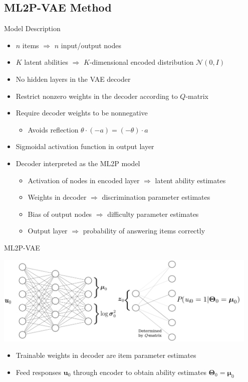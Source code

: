\documentclass{beamer}
\newcommand{\vect}[1]{\boldsymbol{#1}}
\theoremstyle{definition}
\begin{document}
\subsection{ML2P-VAE Method}

\begin{frame}{Model Description}
  \small
\begin{itemize}
  \item $n$ items $\Rightarrow$ $n$ input/output nodes
  \item $K$ latent abilities $\Rightarrow$ $K$-dimensional encoded distribution $\mathcal{N}(0,I)$
\item<2-> No hidden layers in the VAE decoder
\item<2-> Restrict nonzero weights in the decoder according to $Q$-matrix
\item<2-> Require decoder weights to be nonnegative 
  \begin{itemize}
    \item Avoids reflection $\theta\cdot (-a) = (-\theta)\cdot a$
  \end{itemize}
\item<4-> Sigmoidal activation function in output layer
\item<5-> Decoder interpreted as the ML2P model
  \begin{itemize}
    \item<5-> Activation of nodes in encoded layer $\Rightarrow$ latent ability estimates 
    \item<5-> Weights in decoder $\Rightarrow$ discrimination parameter estimates
    \item<5-> Bias of output nodes $\Rightarrow$ difficulty parameter estimates
    \item<5-> Output layer $\Rightarrow$ probability of answering items correctly
  \end{itemize}
\end{itemize}
\end{frame}

\begin{frame}{ML2P-VAE}
\begin{center}
  \includegraphics[width=0.95\textwidth]{../img/ml2p_vae_ind.png}
\end{center}
\begin{itemize}
  \item Trainable weights in decoder are item parameter estimates
  \item Feed responses $\vect u_0$ through encoder to obtain ability estimates $\vect \Theta_0 = \vect \mu_0$
\end{itemize}
\end{frame}
\end{document}
